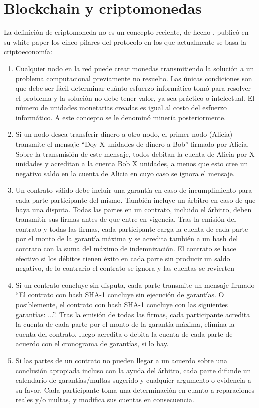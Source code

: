 \documentclass[../main/main.tex]{subfiles}
\begin{document}
  \section{Blockchain y criptomonedas}

  La definición de criptomoneda no es un concepto reciente, de hecho \cite{article:wei_dai_money}, publicó en su white paper los cinco pilares del protocolo en los que actualmente se basa la criptoeconomía:

  \begin{enumerate}
    \item Cualquier nodo en la red puede crear monedas transmitiendo la solución a un problema computacional previamente no resuelto. Las únicas condiciones son que debe ser fácil determinar cuánto esfuerzo informático tomó para resolver el problema y la solución no debe tener valor, ya sea práctico o intelectual. El número de unidades monetarias creadas es igual al costo del esfuerzo informático. A este concepto se le denominó minería posteriormente.
    \item Si un nodo desea transferir dinero a otro nodo, el primer nodo (Alicia) transmite el mensaje ``Doy X unidades de dinero a Bob'' firmado por Alicia. Sobre la transmisión de este mensaje, todos debitan la cuenta de Alicia por X unidades y acreditan a la cuenta Bob X unidades, a menos que esto cree un negativo
    saldo en la cuenta de Alicia en cuyo caso se ignora el mensaje.
    \item Un contrato válido debe incluir una garantía en caso de incumplimiento para cada parte participante del mismo. También incluye un árbitro en caso de que haya una disputa. Todas las partes en un contrato, incluido el árbitro, deben transmitir sus firmas antes de que entre en vigencia. Tras la emisión del contrato y todas las firmas, cada participante carga la cuenta de cada parte por el monto de la garantía máxima y se acredita también a un hash del contrato con la suma del máximo de indemnización. El contrato se hace efectivo si los débitos tienen éxito en cada parte sin producir un saldo negativo, de lo contrario el contrato se ignora y las cuentas se revierten
    \item Si un contrato concluye sin disputa, cada parte transmite un mensaje firmado ``El contrato con hash SHA-1 concluye sin ejecución de garantías. O posiblemente, el contrato con hash SHA-1 concluye con las siguientes garantías: ...''. Tras la emisión de todas las firmas, cada participante acredita la cuenta de cada parte por el monto de la garantía máxima, elimina la cuenta del contrato, luego acredita o debita la cuenta de cada parte de acuerdo con el cronograma de garantías, si lo hay.
    \item Si las partes de un contrato no pueden llegar a un acuerdo sobre una conclusión apropiada incluso con la ayuda del árbitro, cada parte difunde un calendario de garantías/multas sugerido y cualquier argumento o evidencia a su favor. Cada participante toma una determinación en cuanto a reparaciones reales y/o multas, y modifica sus cuentas en consecuencia.
  \end{enumerate}
\end{document}
